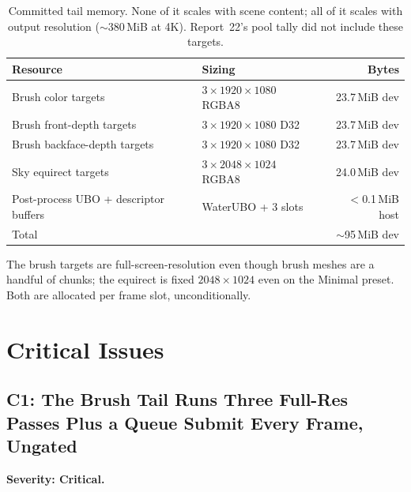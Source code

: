 \documentclass[11pt,a4paper]{article}
\begin{document}
\begin{table}[h]
\centering
\small
\begin{tabular}{@{}p{5.9cm}p{4.3cm}r@{}}
\toprule
\textbf{Resource} & \textbf{Sizing} & \textbf{Bytes} \\
\midrule
Brush color targets & $3 \times 1920\times1080$ RGBA8 & 23.7\,MiB dev \\
Brush front-depth targets & $3 \times 1920\times1080$ D32 & 23.7\,MiB dev \\
Brush backface-depth targets & $3 \times 1920\times1080$ D32 & 23.7\,MiB dev \\
Sky equirect targets & $3 \times 2048\times1024$ RGBA8 & 24.0\,MiB dev \\
Post-process UBO + descriptor buffers & WaterUBO + 3 slots & $<$0.1\,MiB host \\
\midrule
Total & & $\sim$95\,MiB dev \\
\bottomrule
\end{tabular}
\caption{Committed tail memory. None of it scales with scene content; all
of it scales with output resolution ($\sim$380\,MiB at 4K). Report~22's
pool tally did not include these targets.}
\end{table}

The brush targets are full-screen-resolution even though brush meshes are a
handful of chunks; the equirect is fixed $2048\times1024$ even on the
Minimal preset. Both are allocated per frame slot, unconditionally.

\section{Critical Issues}

\subsection{C1: The Brush Tail Runs Three Full-Res Passes Plus a Queue Submit Every Frame, Ungated}
\label{sec:c1}

\textbf{Severity: Critical.}
\end{document}
